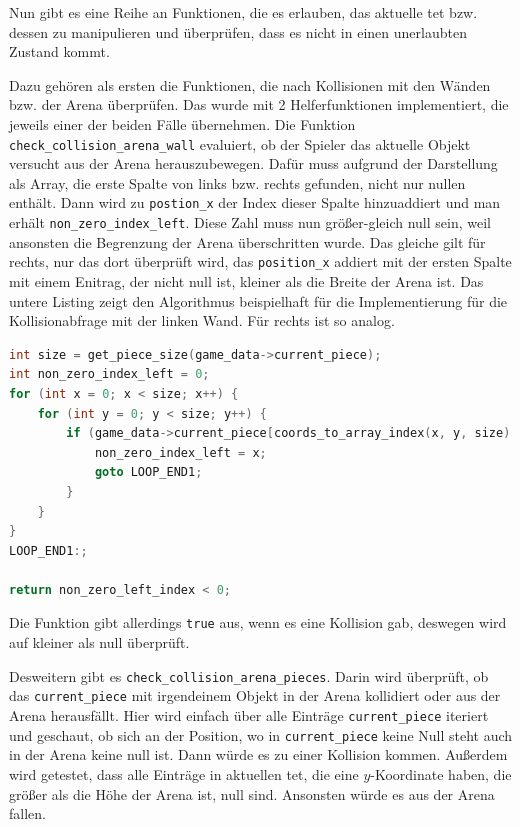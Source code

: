 \documentclass[11pt]{article}
\newcommand{\lstin}[1]{\lstinline[language=C]{#1}}
\begin{document}
Nun gibt es eine Reihe an Funktionen, die es erlauben, das aktuelle \gls{tet} bzw. dessen zu manipulieren und überprüfen, dass es nicht in einen unerlaubten Zustand kommt.

Dazu gehören als ersten die Funktionen, die nach Kollisionen mit den Wänden bzw. der Arena überprüfen. 
Das wurde mit 2 Helferfunktionen implementiert, die jeweils einer der beiden Fälle übernehmen.
Die Funktion \lstin{check_collision_arena_wall} evaluiert, ob der Spieler das aktuelle Objekt versucht aus der Arena herauszubewegen. 
Dafür muss aufgrund der Darstellung als Array, die erste Spalte von links bzw. rechts gefunden, nicht nur nullen enthält.
Dann wird zu \lstin{postion_x} der Index dieser Spalte hinzuaddiert und man erhält \lstin{non_zero_index_left}. Diese Zahl muss nun größer-gleich null sein, weil ansonsten die Begrenzung der Arena überschritten wurde.
Das gleiche gilt für rechts, nur das dort überprüft wird, das \lstin{position_x} addiert mit der ersten Spalte mit einem Enitrag, der nicht null ist, kleiner als die Breite der Arena ist.
Das untere Listing zeigt den Algorithmus beispielhaft für die Implementierung für die Kollisionabfrage mit der linken Wand. Für rechts ist so analog.
\begin{lstlisting}[language=C]
int size = get_piece_size(game_data->current_piece);
int non_zero_index_left = 0;
for (int x = 0; x < size; x++) {
    for (int y = 0; y < size; y++) {
        if (game_data->current_piece[coords_to_array_index(x, y, size) + 1] != 0) {
            non_zero_index_left = x;
            goto LOOP_END1;
        }
    }
}
LOOP_END1:;

return non_zero_left_index < 0; 
\end{lstlisting}

Die Funktion gibt allerdings \lstin{true} aus, wenn es eine Kollision gab, deswegen wird auf kleiner als null überprüft.

Desweitern gibt es \lstin{check_collision_arena_pieces}. Darin wird überprüft, ob das \lstin{current_piece} mit irgendeinem Objekt in der Arena kollidiert oder aus der Arena herausfällt.
Hier wird einfach über alle Einträge \lstin{current_piece} iteriert und geschaut, ob sich an der Position, wo in \lstin{current_piece} keine Null steht auch in der Arena keine null ist. 
Dann würde es zu einer Kollision kommen. Außerdem wird getestet, dass alle Einträge in aktuellen \gls{tet}, die eine $y$-Koordinate haben, die größer als die Höhe der Arena ist, null sind.
Ansonsten würde es aus der Arena fallen.
\end{document}
